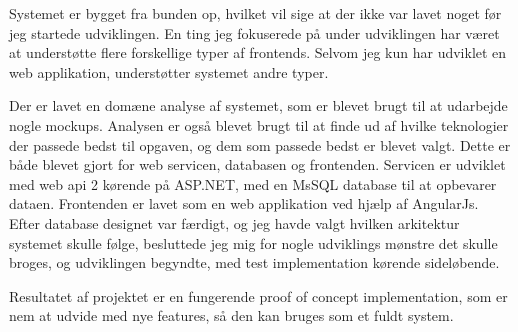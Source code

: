 Systemet er bygget fra bunden op, hvilket vil sige at der ikke var lavet noget
før jeg startede udviklingen. En ting jeg fokuserede på under udviklingen har
været at understøtte flere forskellige typer af frontends. Selvom jeg kun har
udviklet en web applikation, understøtter systemet andre typer.

Der er lavet en domæne analyse af systemet, som er blevet brugt til at udarbejde
nogle mockups. Analysen er også blevet brugt til at finde ud af hvilke
teknologier der passede bedst til opgaven, og dem som passede bedst er blevet
valgt. Dette er både blevet gjort for web servicen, databasen og frontenden.
Servicen er udviklet med web api 2 kørende på ASP.NET, med en MsSQL database
til at opbevarer dataen. Frontenden er lavet som en web applikation ved hjælp
af AngularJs. Efter database designet var færdigt, og jeg havde valgt hvilken
arkitektur systemet skulle følge, besluttede jeg mig for nogle udviklings
mønstre det skulle broges, og udviklingen begyndte, med test implementation
kørende sideløbende. 

Resultatet af projektet er en fungerende proof of concept implementation, som er
nem at udvide med nye features, så den kan bruges som et fuldt system.